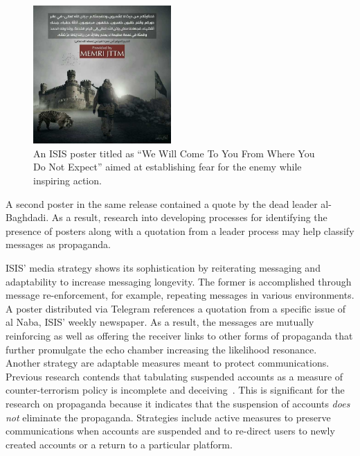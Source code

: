 \documentclass[letterpaper]{article} %
\begin{document}
\begin{figure}[ht]
\includegraphics[width=0.47\textwidth]{img/poster2.jpeg}
\caption{An ISIS poster titled as ``We Will Come To You From Where You Do Not Expect'' aimed at establishing fear for the enemy while inspiring action.}
\label{fig:memri-poster}
\end{figure}

A second poster in the same release contained a quote by the dead leader al-Baghdadi. As a result, research into developing processes for identifying the presence of posters along with a quotation from a leader process may help classify messages as propaganda. 

ISIS' media strategy shows its sophistication by reiterating messaging and adaptability to increase messaging longevity. The former is accomplished through message re-enforcement, for example, repeating messages in various environments. A poster distributed via Telegram references a quotation from a specific issue of al Naba, ISIS' weekly newspaper. As a result, the messages are mutually reinforcing as well as offering the receiver links to other forms of propaganda that further promulgate the echo chamber increasing the likelihood resonance. Another strategy are adaptable measures meant to protect communications. Previous research contends that tabulating suspended accounts as a  measure of counter-terrorism policy is incomplete and deceiving~\cite{weirman2020hyperlinked}.
This is significant for the research on propaganda because it indicates that the suspension of accounts\textit{ does not} eliminate the propaganda. Strategies include active measures to preserve communications when accounts are suspended and to re-direct users to newly created accounts or a return to a particular platform.
\end{document}
